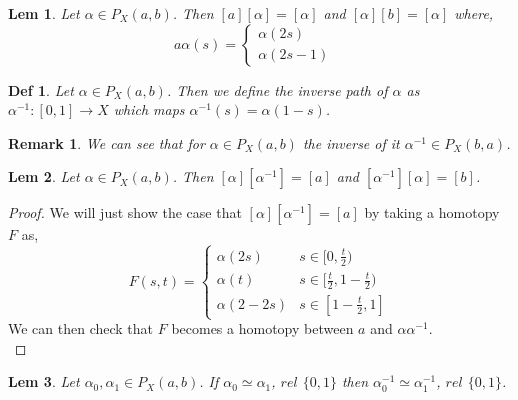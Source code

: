 \documentclass[paper=a4, fontsize=11pt]{scrartcl}
\newtheorem{definition}{Def}
\newtheorem{lemma}{Lem}
\newtheorem*{remark}{Remark}
\begin{document}
\begin{lemma}
	Let $\alpha \in P_X(a,b)$. Then $[a][\alpha]=[\alpha]$ and $[\alpha][b]=[\alpha]$ where,
	\begin{equation}\nonumber
		a\alpha(s) =
		\begin{cases}
		\alpha(2s) & \\
		\alpha(2s-1)
		\end{cases}
	\end{equation}
\end{lemma}

\vspace{0.1in}

\begin{definition}
	Let $\alpha\in P_X(a,b)$. Then we define the inverse path of $\alpha$ as $\alpha^{-1}:[0,1]\to X$ which maps $\alpha^{-1}(s) = \alpha(1-s)$. \\
\end{definition}

\begin{remark}
	We can see that for $\alpha\in P_X(a,b)$ the inverse of it $\alpha^{-1}\in P_X(b,a)$.\\
\end{remark}

\begin{lemma}
	Let $\alpha\in P_X(a,b)$. Then $[\alpha][\alpha^{-1}]=[a]$ and $[\alpha^{-1}][\alpha]=[b]$.\\
\end{lemma}

\begin{proof}
	We will just show the case that $[\alpha][\alpha^{-1}]=[a]$ by taking a homotopy $F$ as,
	\begin{equation}\nonumber
		F(s,t) =
		\begin{cases}
		\alpha(2s) & s \in [0,\frac{t}{2}) \\
		\alpha(t) &  s \in [\frac{t}{2}, 1-\frac{t}{2})\\
		\alpha(2-2s) & s \in [1-\frac{t}{2},1]
		\end{cases}
	\end{equation}
	We can then check that $F$ becomes a homotopy between $a$ and $\alpha\alpha^{-1}$.\\
\end{proof}

\begin{lemma}
	Let $\alpha_0,\alpha_1 \in P_X(a,b)$. If $\alpha_0 \simeq \alpha_1$, $rel$ $\{0,1\}$ then $\alpha_0^{-1}\simeq \alpha_1^{-1}$, $rel$ $\{0,1\}$.\\
\end{lemma}
\end{document}
